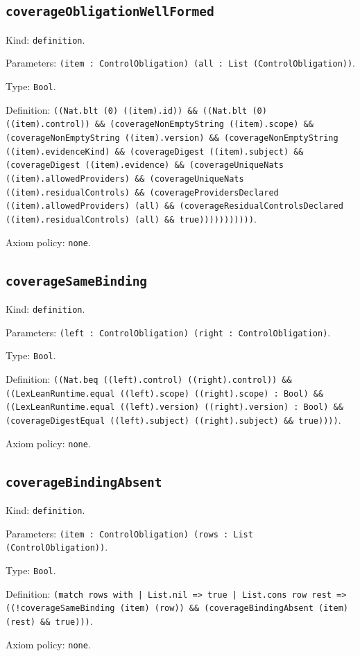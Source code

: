 \documentclass[11pt]{article}
\begin{document}
\subsection*{\texttt{coverageObligationWellFormed}}
\noindent Kind: \texttt{definition}.\par
\noindent Parameters: \texttt{(item : ControlObligation) (all : List (ControlObligation))}.\par
\noindent Type: \texttt{Bool}.\par
\noindent Definition: \texttt{((Nat.blt (0) ((item).id)) \&\& ((Nat.blt (0) ((item).control)) \&\& (coverageNonEmptyString ((item).scope) \&\& (coverageNonEmptyString ((item).version) \&\& (coverageNonEmptyString ((item).evidenceKind) \&\& (coverageDigest ((item).subject) \&\& (coverageDigest ((item).evidence) \&\& (coverageUniqueNats ((item).allowedProviders) \&\& (coverageUniqueNats ((item).residualControls) \&\& (coverageProvidersDeclared ((item).allowedProviders) (all) \&\& (coverageResidualControlsDeclared ((item).residualControls) (all) \&\& true)))))))))))}.\par
\noindent Axiom policy: \texttt{none}.\par
\subsection*{\texttt{coverageSameBinding}}
\noindent Kind: \texttt{definition}.\par
\noindent Parameters: \texttt{(left : ControlObligation) (right : ControlObligation)}.\par
\noindent Type: \texttt{Bool}.\par
\noindent Definition: \texttt{((Nat.beq ((left).control) ((right).control)) \&\& ((LexLeanRuntime.equal ((left).scope) ((right).scope) : Bool) \&\& ((LexLeanRuntime.equal ((left).version) ((right).version) : Bool) \&\& (coverageDigestEqual ((left).subject) ((right).subject) \&\& true))))}.\par
\noindent Axiom policy: \texttt{none}.\par
\subsection*{\texttt{coverageBindingAbsent}}
\noindent Kind: \texttt{definition}.\par
\noindent Parameters: \texttt{(item : ControlObligation) (rows : List (ControlObligation))}.\par
\noindent Type: \texttt{Bool}.\par
\noindent Definition: \texttt{(match rows with | List.nil => true | List.cons row rest => ((!coverageSameBinding (item) (row)) \&\& (coverageBindingAbsent (item) (rest) \&\& true)))}.\par
\noindent Axiom policy: \texttt{none}.\par
\end{document}
